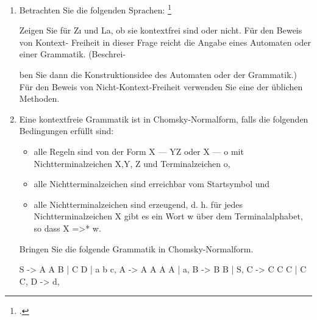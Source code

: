 \documentclass{bschlangaul-aufgabe}
\begin{document}

\let\schrittE=\bChomskyUeberErklaerung

\begin{enumerate}


\item Betrachten Sie die folgenden Sprachen:
\footcite{examen:46115:2019:09}



Zeigen Sie für Zı und La, ob sie kontextfrei sind oder nicht. Für den Beweis von Kontext-
Freiheit in dieser Frage reicht die Angabe eines Automaten oder einer Grammatik. (Beschrei-

ben Sie dann die Konstruktionsidee des Automaten oder der Grammatik.) Für den Beweis
von Nicht-Kontext-Freiheit verwenden Sie eine der üblichen Methoden.


\item Eine kontextfreie Grammatik ist in Chomsky-Normalform, falls die folgenden
Bedingungen erfüllt sind:

\begin{itemize}
\item alle Regeln sind von der Form X — YZ oder X — o mit
Nichtterminalzeichen X,Y, Z und Terminalzeichen o,

\item alle Nichtterminalzeichen sind erreichbar vom Startsymbol und

\item alle Nichtterminalzeichen sind erzeugend, d. h. für jedes
Nichtterminalzeichen X gibt es ein Wort w über dem Terminalalphabet, so
dass X =>* w.
\end{itemize}

Bringen Sie die folgende Grammatik in Chomsky-Normalform.

\begin{bProduktionsRegeln}
S -> A A B | C D | a b c,
A -> A A A A | a,
B -> B B | S,
C -> C C C | C C,
D -> d,
\end{bProduktionsRegeln}


\end{enumerate}
\end{document}
